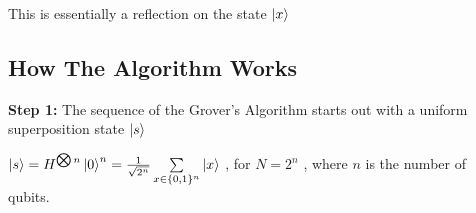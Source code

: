 \documentclass{article}
\begin{document}
This is essentially a reflection on the state $\ket{x}$

\pagebreak

\subsection{How The Algorithm Works}
\vspace{5mm}

\textbf{Step 1:}
\vspace{5mm}
\noindent
The sequence of the Grover's Algorithm starts out with a uniform superposition state $\ket{s}$
\vspace{5mm}

\qquad $ \ket{s}= H^{\bigotimes n} \ket{0}^n = \frac{1}{\sqrt{2^n}}\sum\limits_{x \in \{0,1\}^n}\ket{x} $ , \qquad for $N = 2^n$ , where $n$ is the number of qubits.
\vspace{5mm}



\end{document}
